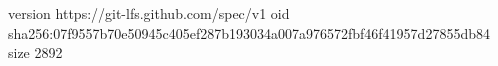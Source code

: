 version https://git-lfs.github.com/spec/v1
oid sha256:07f9557b70e50945c405ef287b193034a007a976572fbf46f41957d27855db84
size 2892
